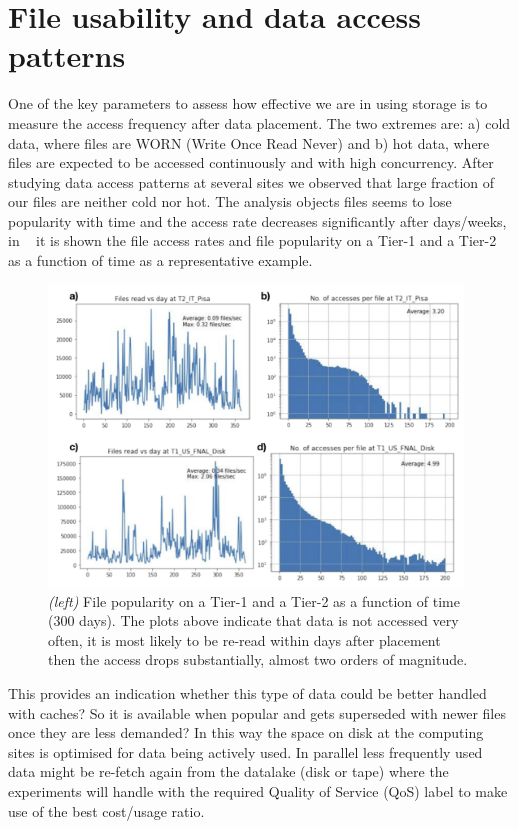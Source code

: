 \section{File usability and data access patterns}
One of the key parameters to assess how effective we are in using storage is to measure the access frequency after data placement. The two extremes are: a) cold data, where files are WORN (Write Once Read Never) and b) hot data, where files are expected to be accessed continuously and with high concurrency.
After studying data access patterns at several sites we observed that large fraction of our files are neither cold nor hot. The analysis objects files seems to lose popularity with time and the access rate decreases significantly after days/weeks, in ~ it is shown the file access rates and file popularity on a Tier-1 and a Tier-2 as a function of time as a representative example.

\begin{figure}[h]
  \centering
  \includegraphics[height=8cm]{dataaccess-chep2019.png}
  \caption{{\em (left)} File popularity on a Tier-1 and a Tier-2 as a function of time (300 days). The plots above indicate that data is not accessed very often, it is most likely to be re-read within days after placement then the access drops substantially, almost two orders of magnitude.}
  \label{access}
\end{figure}

This provides an indication whether this type of data could be better handled with caches? So it is available when popular and gets superseded with newer files once they are less demanded? In this way the space on disk at the computing sites is optimised for data being actively used. In parallel less frequently used data might be re-fetch again from the datalake (disk or tape) where the experiments will handle with the required Quality of Service (QoS) label to make use of the best cost/usage ratio.\\

